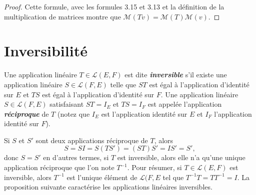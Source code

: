 \documentclass[12pt]{book}
\begin{document}
\begin{prop}
\begin{proof}
Cette formule, avec les formules 3.15 et 3.13 et la définition de la multiplication de matrices montre que $\mathcal{M}(Tv)=\mathcal{M}(T)\mathcal{M}(v)$.
\end{proof}
\end{prop}

\section*{Inversibilité}
Une application linéaire $T\in\mathcal{L}(E,F)$ est dite \textit{\textbf{inversible}} s'il existe une application linéaire  $S\in\mathcal{L}(F,E)$ telle que $ST$ est égal à l'application d'identité sur $E$ et $TS$ est égal à l'application d'identité sur $F$. Une application linéaire $S\in\mathcal{L}(F,E)$ satisfaisant $ST=I_E$ et $TS=I_F$ est appelée l'application \textbf{\textit{réciproque}} de $T$ (notez que $I_E$ est l'application identité sur $E$ et $I_F$ l'application identité sur $F$).

Si $S$ et $S'$ sont deux applications réciproque de $T$, alors
\begin{equation*}
    S=SI=S(TS')=(ST)S'=IS'=S',
\end{equation*}
donc $S=S'$ en d'autres termes, si $T$ est inversible, alors elle n'a qu'une unique application réciproque que l'on note $T^{-1}$. Pour résumer, si $T\in\mathcal{L}(E,F)$ est inversible, alors $T^{-1}$ est l'unique élément de $\mathcal{L}(F,E$ tel que $T^{-1}T=TT^{-1}=I$. La proposition suivante caractérise les applications linéaires inversibles.
\end{document}
